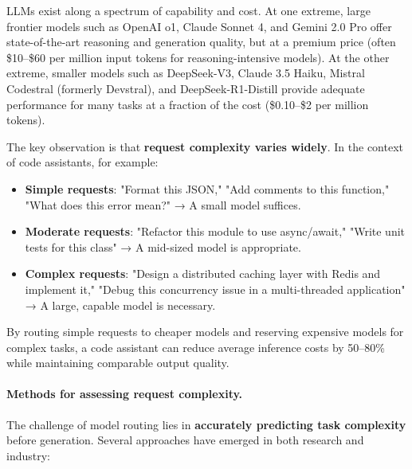 \documentclass[english]{article}
\begin{document}
LLMs exist along a spectrum of capability and cost. At one extreme, large frontier models such as OpenAI o1, Claude Sonnet 4, and Gemini 2.0 Pro offer state-of-the-art reasoning and generation quality, but at a premium price (often \$10--\$60 per million input tokens for reasoning-intensive models). At the other extreme, smaller models such as DeepSeek-V3, Claude 3.5 Haiku, Mistral Codestral (formerly Devstral), and DeepSeek-R1-Distill provide adequate performance for many tasks at a fraction of the cost (\$0.10--\$2 per million tokens).

The key observation is that \textbf{request complexity varies widely}. In the context of code assistants, for example:
\begin{itemize}
    \item \textbf{Simple requests}: "Format this JSON," "Add comments to this function," "What does this error mean?" → A small model suffices.
    \item \textbf{Moderate requests}: "Refactor this module to use async/await," "Write unit tests for this class" → A mid-sized model is appropriate.
    \item \textbf{Complex requests}: "Design a distributed caching layer with Redis and implement it," "Debug this concurrency issue in a multi-threaded application" → A large, capable model is necessary.
\end{itemize}

By routing simple requests to cheaper models and reserving expensive models for complex tasks, a code assistant can reduce average inference costs by 50--80\% while maintaining comparable output quality.

\paragraph{Methods for assessing request complexity.}

The challenge of model routing lies in \textbf{accurately predicting task complexity} before generation. Several approaches have emerged in both research and industry:
\end{document}
